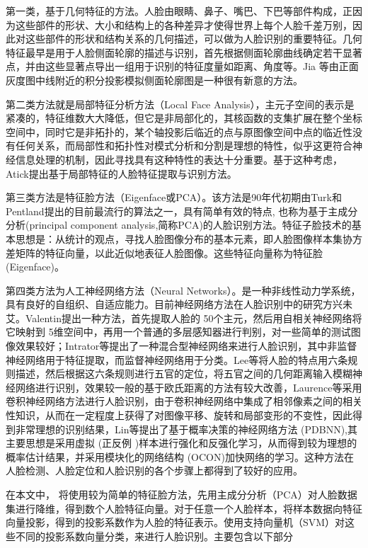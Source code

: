 \documentclass[UTF8]{ctexart}
\begin{document}
第一类，基于几何特征的方法。人脸由眼睛、鼻子、嘴巴、下巴等部件构成，正因为这些部件的形状、大小和结构上的各种差异才使得世界上每个人脸千差万别，因此对这些部件的形状和结构关系的几何描述，可以做为人脸识别的重要特征。几何特征最早是用于人脸侧面轮廓的描述与识别，首先根据侧面轮廓曲线确定若干显著点，并由这些显著点导出一组用于识别的特征度量如距离、角度等。Jia 等由正面灰度图中线附近的积分投影模拟侧面轮廓图是一种很有新意的方法。\vspace{3mm}

第二类方法就是局部特征分析方法（Local Face Analysis），主元子空间的表示是紧凑的，特征维数大大降低，但它是非局部化的，其核函数的支集扩展在整个坐标空间中，同时它是非拓扑的，某个轴投影后临近的点与原图像空间中点的临近性没有任何关系，而局部性和拓扑性对模式分析和分割是理想的特性，似乎这更符合神经信息处理的机制，因此寻找具有这种特性的表达十分重要。基于这种考虑，Atick提出基于局部特征的人脸特征提取与识别方法。\vspace{3mm}

第三类方法是特征脸方法（Eigenface或PCA）。该方法是90年代初期由Turk和Pentland提出的目前最流行的算法之一，具有简单有效的特点, 也称为基于主成分分析(principal component analysis,简称PCA)的人脸识别方法。特征子脸技术的基本思想是：从统计的观点，寻找人脸图像分布的基本元素，即人脸图像样本集协方差矩阵的特征向量，以此近似地表征人脸图像。这些特征向量称为特征脸(Eigenface)。\vspace{3mm}

第四类方法为人工神经网络方法（Neural Networks）。是一种非线性动力学系统，具有良好的自组织、自适应能力。目前神经网络方法在人脸识别中的研究方兴未艾。Valentin提出一种方法，首先提取人脸的 50个主元，然后用自相关神经网络将它映射到 5维空间中，再用一个普通的多层感知器进行判别，对一些简单的测试图像效果较好；Intrator等提出了一种混合型神经网络来进行人脸识别，其中非监督神经网络用于特征提取，而监督神经网络用于分类。Lee等将人脸的特点用六条规则描述，然后根据这六条规则进行五官的定位，将五官之间的几何距离输入模糊神经网络进行识别，效果较一般的基于欧氏距离的方法有较大改善，Laurence等采用卷积神经网络方法进行人脸识别，由于卷积神经网络中集成了相邻像素之间的相关性知识，从而在一定程度上获得了对图像平移、旋转和局部变形的不变性，因此得到非常理想的识别结果，Lin等提出了基于概率决策的神经网络方法 (PDBNN),其主要思想是采用虚拟 (正反例 )样本进行强化和反强化学习，从而得到较为理想的概率估计结果，并采用模块化的网络结构 (OCON)加快网络的学习。这种方法在人脸检测、人脸定位和人脸识别的各个步骤上都得到了较好的应用。\vspace{3mm}

在本文中， 将使用较为简单的特征脸方法，先用主成分分析（PCA）对人脸数据集进行降维，得到数个人脸特征向量。对于任意一个人脸样本，将样本数据向特征向量投影，得到的投影系数作为人脸的特征表示。使用支持向量机（SVM）对这些不同的投影系数向量分类，来进行人脸识别。主要包含以下部分\vspace{3mm}
\end{document}
